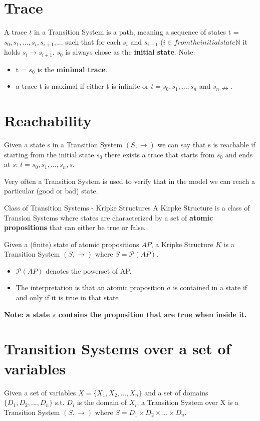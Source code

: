 \section{Trace}
A trace $t$ in a Transition System is a path, meaning a sequence of states t = $s_0, s_1, ..., s_i, s_{i+1}, ...$ such that for each $s_i$ and $s_{i+1}$ ($i \in from the initial state \mathbb{N}$ it holds $s_i \rightarrow s_{i+1}$. $s_0$ is always chose as the \textbf{initial state}.
Note:
\begin{itemize}
    \item t = $s_0$ is the \textbf{minimal trace}.
    \item a trace t is maximal if either t is infinite or $t = s_0, s_1, ..., s_n$ and $s_n \nrightarrow$.
\end{itemize}

\section{Reachability}
Given a state s in a Transition System $(S, \rightarrow)$ we can say that s is reachable if starting from the initial state $s_0$ there exists a trace that starts from $s_0$ and ends at $s$: $t = s_0, s_1, ..., s_n, s$.\par
Very often a Transition System is used to verify that in the model we can reach a particular (good or bad) state.

\par{Class of Transition Systems - Kripke Structures}
A Kirpke Structure is a class of Transion Systems where states are characterized by a set of \textbf{atomic propositions} that can either be true or false. \par
Given a (finite) state of atomic propositions $AP$, a Kripke Structure $K$ is a Transition System $(S, \rightarrow)$ where $S = \mathcal{P}(AP)$.
\begin{itemize}
    \item $\mathcal{P}(AP)$ denotes the powerset of AP.
    \item The interpretation is that an atomic proposition $a$ is contained in a state if and only if it is true in that state
\end{itemize}

\textbf{Note: a state $s$ contains the proposition that are true when inside it.}

\section{Transition Systems over a set of variables}
Given a set of variables $X = \{ X_1, X_2, ..., X_n\}$ and a set of domains $\{D_1, D_2, ..., D_n\}$ s.t. $D_i$ is the domain of $X_i$, a Transition System over X is a Transition System $(S, \rightarrow)$ where $S = D_1 \times D_2 \times ... \times D_n$.

